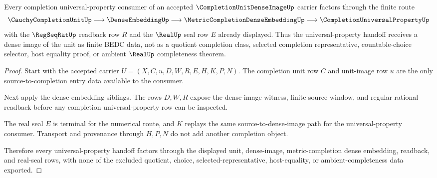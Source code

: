 \begin{theorem}
\label{thm:completion-unit-dense-image-universal-route}
Every completion universal-property consumer of an accepted $\CompletionUnitDenseImageUp$ carrier factors through the finite route
$$
\CauchyCompletionUnitUp \longrightarrow \DenseEmbeddingUp \longrightarrow \MetricCompletionDenseEmbeddingUp \longrightarrow \CompletionUniversalPropertyUp
$$
with the $\RegSeqRatUp$ readback row $R$ and the $\RealUp$ seal row $E$ already displayed. Thus the universal-property handoff receives a dense image of the unit as finite BEDC data, not as a quotient completion class, selected completion representative, countable-choice selector, host equality proof, or ambient $\RealUp$ completeness theorem.
\end{theorem}
\begin{proof}
Start with the accepted carrier $U=(X,C,u,D,W,R,E,H,K,P,N)$. The completion unit row $C$ and unit-image row $u$ are the only source-to-completion entry data available to the consumer.

Next apply the dense embedding siblings. The rows $D,W,R$ expose the dense-image witness, finite source window, and regular rational readback before any completion universal-property row can be inspected.

The real seal $E$ is terminal for the numerical route, and $K$ replays the same source-to-dense-image path for the universal-property consumer. Transport and provenance through $H,P,N$ do not add another completion object.

Therefore every universal-property handoff factors through the displayed unit, dense-image, metric-completion dense embedding, readback, and real-seal rows, with none of the excluded quotient, choice, selected-representative, host-equality, or ambient-completeness data exported.
\end{proof}



